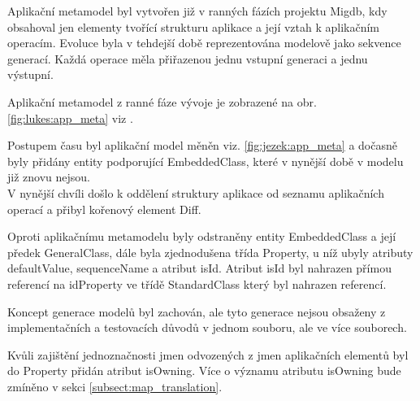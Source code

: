 \documentclass[11pt,twoside,a4paper]{book}
\begin{document}
Aplikační metamodel byl vytvořen již v ranných fázích projektu Migdb, kdy
obsahoval jen elementy tvořící strukturu aplikace a její vztah k
aplikačním operacím. Evoluce byla v tehdejší době reprezentována
modelově jako sekvence generací. Každá operace měla přiřazenou jednu vstupní
generaci a jednu výstupní.

Aplikační metamodel z ranné fáze vývoje je zobrazené na obr.
\ref{fig:lukes:app_meta} viz \cite{Lukes}.


Postupem času byl aplikační model měněn viz. \ref{fig:jezek:app_meta}
\cite{Jezek} a dočasně byly přidány entity podporující EmbeddedClass, které v
nynější době v modelu již znovu nejsou.\\

V nynější chvíli došlo k oddělení struktury aplikace od seznamu
aplikačních operací a přibyl kořenový element Diff.

Oproti aplikačnímu metamodelu \cite{Jezek} byly odstraněny entity EmbeddedClass 
a její předek GeneralClass, dále byla zjednodušena třída Property, u níž ubyly
atributy defaultValue, sequenceName a atribut isId. Atribut isId byl nahrazen
přímou referencí na idProperty ve třídě StandardClass který byl nahrazen 
referencí.

Koncept generace modelů byl zachován, ale tyto generace nejsou obsaženy z
implementačních a testovacích důvodů v jednom souboru, ale ve více souborech.

Kvůli zajištění jednoznačnosti jmen odvozených z jmen aplikačních elementů byl
do Property přidán atribut isOwning. Více o významu atributu isOwning bude
zmíněno v sekci \ref{subsect:map_translation}.
\end{document}
